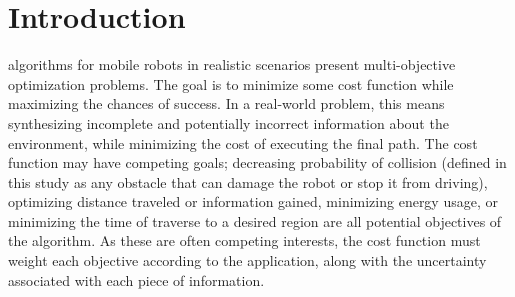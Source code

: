 \documentclass[journal]{IEEEtran}
\begin{document}

\IEEEpeerreviewmaketitle



\section{Introduction}
 algorithms for mobile robots in realistic scenarios present multi-objective optimization problems. 
The goal is to minimize some cost function while maximizing the chances of success. 
In a real-world problem, this means synthesizing incomplete and potentially incorrect information about the environment, while minimizing the cost of executing the final path. 
The cost function may have competing goals; decreasing probability of collision (defined in this study as any obstacle that can damage the robot or stop it from driving), optimizing distance traveled or information gained, minimizing energy usage, or minimizing the time of traverse to a desired region are all potential objectives of the algorithm.
As these are often competing interests, the cost function must weight each objective according to the application, along with the uncertainty associated with each piece of information. 
\end{document}
